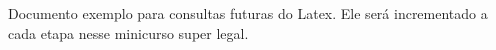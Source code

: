 \documentclass{article}
\begin{document}
	Documento exemplo para consultas futuras do Latex.
	Ele será incrementado a cada etapa nesse minicurso super legal.
\end{document}
